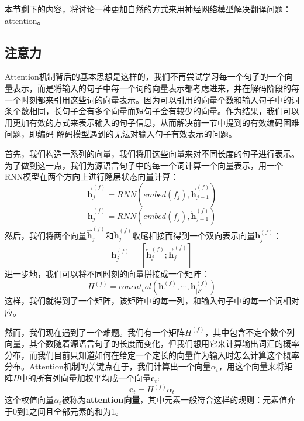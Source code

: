\documentclass[10pt,a4paper]{ctexart}
\begin{document}
本节剩下的内容，将讨论一种更加自然的方式来用神经网络模型解决翻译问题：attention。

\subsection{注意力}
Attention机制背后的基本思想是这样的，我们不再尝试学习每一个句子的一个向量表示，而是将输入的句子中每一个词的向量表示都考虑进来，并在解码阶段的每一个时刻都来引用这些词的向量表示。因为可以引用的向量个数和输入句子中的词条个数相同，长句子会有多个向量而短句子会有较少的向量。作为结果，我们可以用更加有效的方式来表示输入的句子信息，从而解决前一节中提到的有效编码困难问题，即编码-解码模型遇到的无法对输入句子有效表示的问题。

首先，我们构造一系列的向量，我们将用这些向量来对不同长度的句子进行表示。为了做到这一点，我们为源语言句子中的每一个词计算一个向量表示，用一个RNN模型在两个方向上进行隐层状态向量计算：
\[
 \overrightarrow{\textbf{h}}_j^{(f)} = RNN(embed(f_j),\overrightarrow{\textbf{h}}_{j-1}^{(f)})
\]
\[
 \overleftarrow{\textbf{h}}_j^{(f)} = RNN(embed(f_j),\overleftarrow{\textbf{h}}_{j+1}^{(f)})
\]
然后，我们将两个向量$\overrightarrow{\textbf{h}}_j^{(f)}$和$\overleftarrow{\textbf{h}}_j^{(f)}$收尾相接而得到一个双向表示向量$\textbf{h}_j^{(f)}$：
\[
 \textbf{h}_j^{(f)} = [\overleftarrow{\textbf{h}}_j^{(f)};\overrightarrow{\textbf{h}}_j^{(f)}]
\]
进一步地，我们可以将不同时刻的向量拼接成一个矩阵：
\[
 H^{(f)} = concat_col(\textbf{h}_1^{(f)},\cdots,\textbf{h}_{|F|}^{(f)})
\]
这样，我们就得到了一个矩阵，该矩阵中的每一列，和输入句子中的每一个词相对应。

然而，我们现在遇到了一个难题。我们有一个矩阵$H^{(f)}$，其中包含不定个数个列向量，其个数随着源语言句子的长度而变化，但我们想用它来计算输出词汇的概率分布，而我们目前只知道如何在给定一个定长的向量作为输入时怎么计算这个概率分布。Attention机制的关键点在于，我们计算出一个向量$\textbf{$\alpha$}_t$，用这个向量来将矩阵$H$中的所有列向量加权平均成一个向量$\textbf{c}_t$:
\[
 \textbf{c}_t = H^{(f)} \textbf{$\alpha$}_t
\]
这个权值向量$\textbf{$\alpha$}_t$被称为\textbf{attention向量}，其中元素一般符合这样的规则：元素值介于0到1之间且全部元素的和为1。
\end{document}
